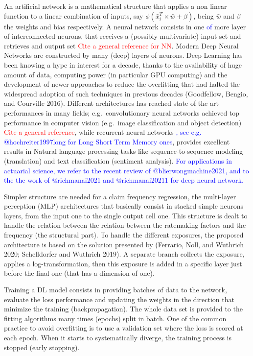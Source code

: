 \documentclass[
]{article}
\begin{document}
An artificial network is a mathematical structure that applies a non
linear function to a linear combination of inputs, say
\(\phi\left(\bar x_i^T \times \bar w+\beta\right)\), being \(\bar w\)
and \(\beta\) the weights and bias respectively. A neural network
consists in one \textcolor{blue}{of} more layer of interconnected
neurons, that receives a (possibly multivariate) input set and retrieves
and output set \textcolor{red}{Cite a general reference for NN}. Modern
Deep Neural Networks are constructed by many (deep) layers of neurons.
Deep Learning has been knowing a hype in interest for a decade, thanks
to the availability of huge amount of data, computing power (in
particular GPU computing) and the development of newer approaches to
reduce the overfitting that had halted the widespread adoption of such
techniques in previous decades (Goodfellow, Bengio, and Courville 2016).
Different architectures has reached state of the art performances in
many fields; e.g.~convolutionary neural networks achieved top
performance in computer vision (e.g.~image classification and object
detection) \textcolor{red}{Cite a general reference}, while recurrent
neural networks
\textcolor{blue}{, see e.g. @hochreiter1997long for Long Short Term Memory ones},
provides excellent results in Natural language processing tasks like
sequence-to-sequence modeling (translation) and text classification
(sentiment analysis).
\textcolor{blue}{For applications in actuarial science, we refer to the recent review of @blierwongmachine2021, and to the the work of 
@richmanai2021 and @richmanai20211 for deep neural network.}

Simpler structure are needed for a claim frequency regression, the
multi-layer perception (MLP) architectures that basically consist in
stacked simple neurons layers, from the input one to the single output
cell one. This structure is dealt to handle the relation between the
relation between the ratemaking factors and the frequency (the
structural part). To handle the different exposures, the proposed
architecture is based on the solution presented by (Ferrario, Noll, and
Wuthrich 2020; Schelldorfer and Wuthrich 2019). A separate branch
collects the exposure, applies a log-transformation, then this exposure
is added in a specific layer just before the final one (that has a
dimension of one).

Training a DL model consists in providing batches of data to the
network, evaluate the loss performance and updating the weights in the
direction that minimize the training (backpropagation). The whole data
set is provided to the fitting algorithms many times (epochs) split in
batch. One of the common practice to avoid overfitting is to use a
validation set where the loss is scored at each epoch. When it starts to
systematically diverge, the training process is stopped (early
stopping).
\end{document}
